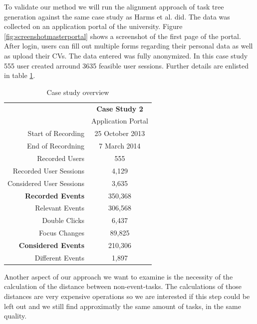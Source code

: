 To validate our method we will run the alignment approach of task tree generation against the same case study as Harms et al. did.
The data was collected on an application portal of the university. Figure \ref{fig:screenshotmasterportal} shows a screenshot of the first page of the portal.
After login, users can fill out multiple forms regarding their personal data as well as upload their CVs. The data entered was fully anonymized. 
In this case study 555 user created arround 3635 feasible user sessions. Further details are enlisted in table \ref{tab:casestudy2}.



\begin{table}
	\centering
	 \begin{tabular}{|r|c|}
		   \hline
		      & \textbf{Case Study 2} \\
		      & Application Portal \\
		     \hline
		       Start of Recording & 25 October 2013 \\
		       End of Recordning & 7 March 2014 \\
		       Recorded Users & 555 \\
		       Recorded User Sessions & 4,129 \\
		       Considered User Sessions & 3,635 \\
		       \hline
		         \textbf{Recorded Events} & 350,368 \\
		         Relevant Events & 306,568 \\
		         Double Clicks & 6,437 \\
		         Focus Changes & 89,825 \\
		         \hline
			   \textbf{Considered Events} & 210,306 \\
			   Different Events & 1,897 \\
			   \hline
			    \end{tabular}
			    \caption{Case study overview}
	\label{tab:casestudy2}
\end{table}



Another aspect of our approach we want to examine is the necessity of the calculation of the distance between non-event-tasks. 
The calculations of those distances are very expensive operations so we are interested if this step could be left out and we still find approximatly the same amount of tasks, in the same quality.


